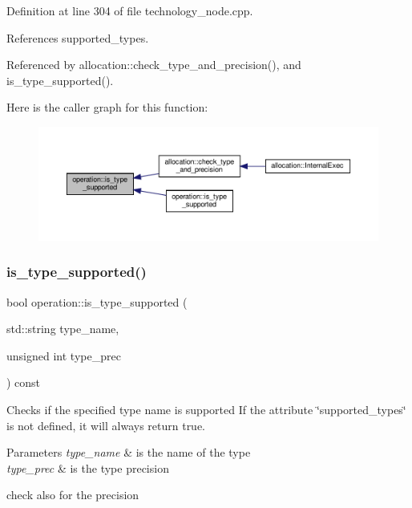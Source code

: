 Definition at line 304 of file technology\+\_\+node.\+cpp.



References supported\+\_\+types.



Referenced by allocation\+::check\+\_\+type\+\_\+and\+\_\+precision(), and is\+\_\+type\+\_\+supported().

Here is the caller graph for this function\+:
\nopagebreak
\begin{figure}[H]
\begin{center}
\leavevmode
\includegraphics[width=350pt]{d9/dc0/structoperation_a271a2bcd8bf499be5df7ae05edb8b64f_icgraph}
\end{center}
\end{figure}
\mbox{\label{structoperation_a34a78778569a0ff97520b3148ec21521}} 
\subsubsection{\texorpdfstring{is\+\_\+type\+\_\+supported()}{is\_type\_supported()}\hspace{0.1cm}{\footnotesize\ttfamily [2/3]}}
{\footnotesize\ttfamily bool operation\+::is\+\_\+type\+\_\+supported (\begin{DoxyParamCaption}\item[{std\+::string}]{type\+\_\+name,  }\item[{unsigned int}]{type\+\_\+prec }\end{DoxyParamCaption}) const}



Checks if the specified type name is supported If the attribute \char`\"{}supported\+\_\+types\char`\"{} is not defined, it will always return true. 


\begin{DoxyParams}{Parameters}
{\em type\+\_\+name} & is the name of the type \\
\hline
{\em type\+\_\+prec} & is the type precision \\
\hline
\end{DoxyParams}
check also for the precision 

